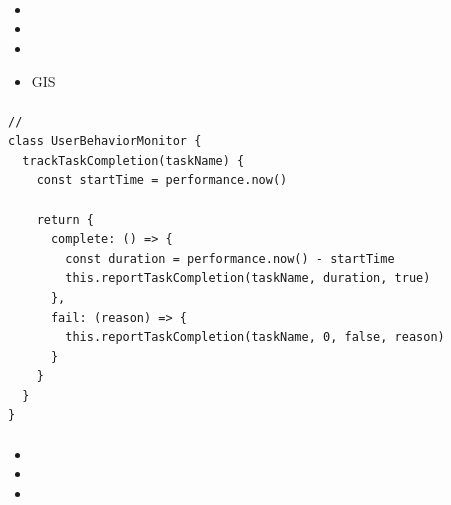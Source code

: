 \hypertarget{section-66}{%
\paragraph{}\label{section-66}}

\begin{itemize}
\item
\item
  \important{}
\item
  \important{}
\item
  \important{}GIS
\end{itemize}

\hypertarget{section-67}{%
\paragraph{}\label{section-67}}

\begin{lstlisting}[style=javascript]
// 
class UserBehaviorMonitor {
  trackTaskCompletion(taskName) {
    const startTime = performance.now()
    
    return {
      complete: () => {
        const duration = performance.now() - startTime
        this.reportTaskCompletion(taskName, duration, true)
      },
      fail: (reason) => {
        this.reportTaskCompletion(taskName, 0, false, reason)
      }
    }
  }
}
\end{lstlisting}

\hypertarget{section-68}{%
\paragraph{}\label{section-68}}

\begin{itemize}
\item
  \important{}
\item
  \important{}
\item
  \important{}
\end{itemize}

\hypertarget{section-69}{%
\subsubsection{}\label{section-69}}

\hypertarget{section-70}{%
\paragraph{}\label{section-70}}


